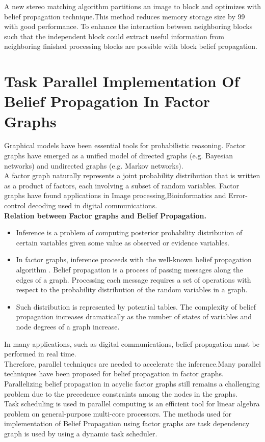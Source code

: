 A new stereo matching algorithm partitions an image to block and optimizes with belief propagation technique.This method reduces memory storage size by 99
with good performance.
 To enhance the interaction  between neighboring blocks such that the independent block could extract useful information from  neighboring finished processing blocks are possible with block belief propagation.
\section{Task Parallel Implementation Of Belief Propagation In Factor Graphs}

Graphical models have been essential tools for probabilistic reasoning. Factor graphs  have emerged as a unified model of directed graphs (e.g. Bayesian networks) and undirected graphs (e.g. Markov networks).\\ A factor graph naturally represents a joint probability distribution that is written as a product of factors, each involving a subset of random variables.
Factor graphs have found applications in   Image processing,Bioinformatics and  Error-control decoding used in digital communications.\\
\textbf{Relation between  Factor graphs and Belief Propagation.}
\begin{itemize}
  \item Inference is a problem of computing posterior probability distribution of certain variables given some value as observed or evidence variables.
  \item In factor graphs, inference proceeds with the well-known belief propagation algorithm . Belief propagation is a process of passing messages along the edges of a graph. Processing each message requires a set of operations with respect to the probability distribution of the random variables in a graph.
  \item Such distribution is represented by potential tables. The complexity of belief propagation increases dramatically as the number of states of variables and node degrees of a graph increase.
\end{itemize}

In many applications, such as digital communications, belief propagation must be performed in real time.\\ Therefore, parallel techniques are needed to accelerate the inference.Many parallel techniques have been proposed for belief propagation in factor graphs.\\ Parallelizing belief propagation in acyclic factor graphs still remains a challenging problem due to the precedence constraints among the nodes in the graphs. \\ Task scheduling is used in parallel computing is an efficient tool  for linear algebra problem on general-purpose multi-core processors.
The  methods used for  implementation of Belief Propagation using factor graphs are task dependency graph is used  by using a dynamic task scheduler.


